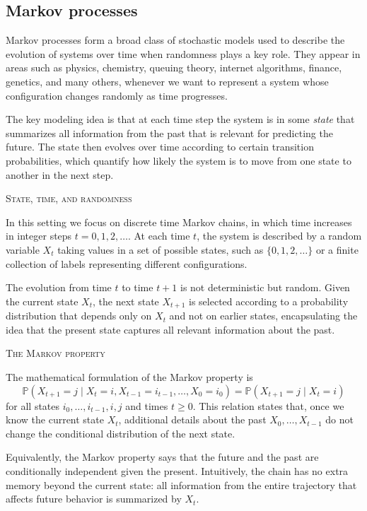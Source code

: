 
\subsection{Markov processes}

Markov processes form a broad class of stochastic models used to describe the evolution of systems over time when randomness plays a key role.
They appear in areas such as physics, chemistry, queuing theory, internet algorithms, finance, genetics, and many others, whenever we want to represent a system whose configuration changes randomly as time progresses.

The key modeling idea is that at each time step the system is in some \textit{state} that summarizes all information from the past that is relevant for predicting the future.
The state then evolves over time according to certain transition probabilities, which quantify how likely the system is to move from one state to another in the next step.

\bigskip
\textsc{State, time, and randomness}

In this setting we focus on discrete time Markov chains, in which time increases in integer steps \(t = 0,1,2,\dots\).
At each time \(t\), the system is described by a random variable \(X_t\) taking values in a set of possible states, such as \(\{0,1,2,\dots\}\) or a finite collection of labels representing different configurations.

The evolution from time \(t\) to time \(t+1\) is not deterministic but random.
Given the current state \(X_t\), the next state \(X_{t+1}\) is selected according to a probability distribution that depends only on \(X_t\) and not on earlier states, encapsulating the idea that the present state captures all relevant information about the past.

\bigskip
\textsc{The Markov property}

The mathematical formulation of the Markov property is
\[
\mathbb{P}(X_{t+1} = j \mid X_t = i, X_{t-1} = i_{t-1}, \dots, X_0 = i_0)
=
\mathbb{P}(X_{t+1} = j \mid X_t = i)
\]
for all states \(i_0,\dots,i_{t-1},i,j\) and times \(t \ge 0\).
This relation states that, once we know the current state \(X_t\), additional details about the past \(X_0,\dots,X_{t-1}\) do not change the conditional distribution of the next state.

Equivalently, the Markov property says that the future and the past are conditionally independent given the present.
Intuitively, the chain has no extra memory beyond the current state: all information from the entire trajectory that affects future behavior is summarized by \(X_t\).

